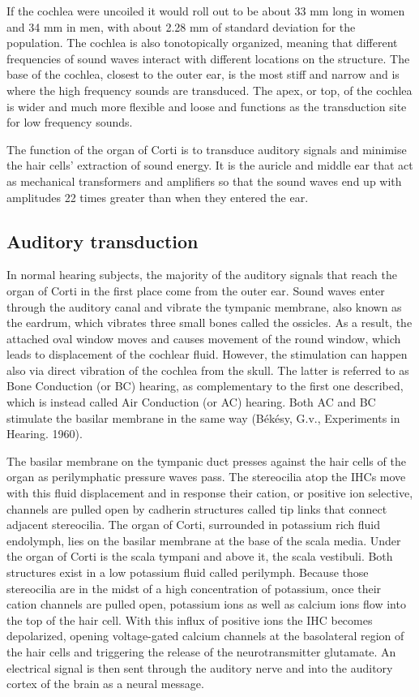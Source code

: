 \documentclass[]{book}
\begin{document}
If the cochlea were uncoiled it would roll out to be about 33 mm long in women and 34 mm in men, with about 2.28 mm of standard deviation for the population. The cochlea is also tonotopically organized, meaning that different frequencies of sound waves interact with different locations on the structure. The base of the cochlea, closest to the outer ear, is the most stiff and narrow and is where the high frequency sounds are transduced. The apex, or top, of the cochlea is wider and much more flexible and loose and functions as the transduction site for low frequency sounds.

The function of the organ of Corti is to transduce auditory signals and minimise the hair cells' extraction of sound energy. It is the auricle and middle ear that act as mechanical transformers and amplifiers so that the sound waves end up with amplitudes 22 times greater than when they entered the ear.

\hypertarget{auditory-transduction}{%
\subsection{Auditory transduction}\label{auditory-transduction}}

In normal hearing subjects, the majority of the auditory signals that reach the organ of Corti in the first place come from the outer ear. Sound waves enter through the auditory canal and vibrate the tympanic membrane, also known as the eardrum, which vibrates three small bones called the ossicles. As a result, the attached oval window moves and causes movement of the round window, which leads to displacement of the cochlear fluid. However, the stimulation can happen also via direct vibration of the cochlea from the skull. The latter is referred to as Bone Conduction (or BC) hearing, as complementary to the first one described, which is instead called Air Conduction (or AC) hearing. Both AC and BC stimulate the basilar membrane in the same way (Békésy, G.v., Experiments in Hearing. 1960).

The basilar membrane on the tympanic duct presses against the hair cells of the organ as perilymphatic pressure waves pass. The stereocilia atop the IHCs move with this fluid displacement and in response their cation, or positive ion selective, channels are pulled open by cadherin structures called tip links that connect adjacent stereocilia. The organ of Corti, surrounded in potassium rich fluid endolymph, lies on the basilar membrane at the base of the scala media. Under the organ of Corti is the scala tympani and above it, the scala vestibuli. Both structures exist in a low potassium fluid called perilymph. Because those stereocilia are in the midst of a high concentration of potassium, once their cation channels are pulled open, potassium ions as well as calcium ions flow into the top of the hair cell. With this influx of positive ions the IHC becomes depolarized, opening voltage-gated calcium channels at the basolateral region of the hair cells and triggering the release of the neurotransmitter glutamate. An electrical signal is then sent through the auditory nerve and into the auditory cortex of the brain as a neural message.
\end{document}
